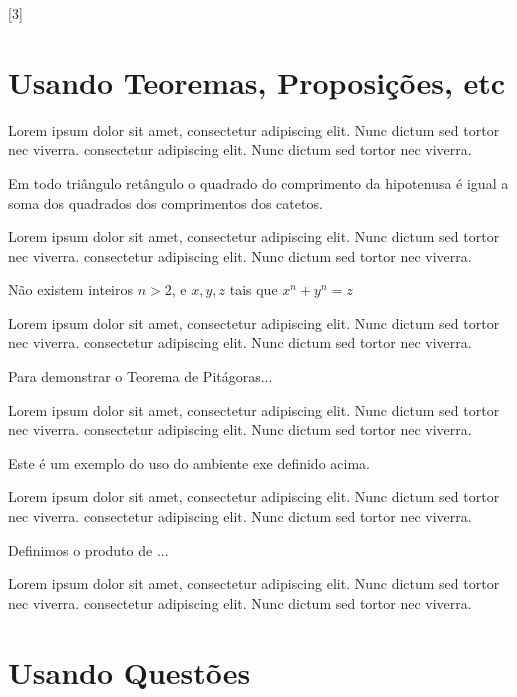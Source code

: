 \documentclass{uecetex2}
\begin{document}
[3]


\section{Usando Teoremas, Proposições, etc}

Lorem ipsum dolor sit amet, consectetur adipiscing elit. Nunc dictum sed tortor nec viverra. consectetur adipiscing elit. Nunc dictum sed tortor nec viverra.

\begin{teo}[Pitágoras]
	Em todo triângulo retângulo o quadrado do comprimento da
	hipotenusa é igual a soma dos quadrados dos comprimentos dos catetos.
\end{teo}


Lorem ipsum dolor sit amet, consectetur adipiscing elit. Nunc dictum sed tortor nec viverra. consectetur adipiscing elit. Nunc dictum sed tortor nec viverra.

\begin{teo}[Fermat]
	Não existem inteiros $n > 2$, e $x, y, z$ tais que $x^n + y^n = z$
\end{teo}

Lorem ipsum dolor sit amet, consectetur adipiscing elit. Nunc dictum sed tortor nec viverra. consectetur adipiscing elit. Nunc dictum sed tortor nec viverra.

\begin{prop}
	Para demonstrar o Teorema de Pitágoras...
\end{prop}

Lorem ipsum dolor sit amet, consectetur adipiscing elit. Nunc dictum sed tortor nec viverra. consectetur adipiscing elit. Nunc dictum sed tortor nec viverra.

\begin{exem}
	Este é um exemplo do uso do ambiente exe definido acima.
\end{exem}

Lorem ipsum dolor sit amet, consectetur adipiscing elit. Nunc dictum sed tortor nec viverra. consectetur adipiscing elit. Nunc dictum sed tortor nec viverra.

\begin{xdefinicao}
	Definimos o produto de ...
\end{xdefinicao}

Lorem ipsum dolor sit amet, consectetur adipiscing elit. Nunc dictum sed tortor nec viverra. consectetur adipiscing elit. Nunc dictum sed tortor nec viverra.

\section{Usando Questões}
\end{document}
